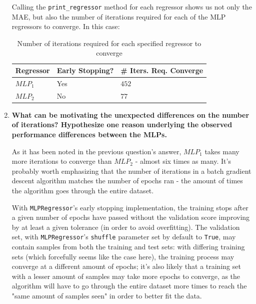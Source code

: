 \documentclass[12pt]{article}
\begin{document}
\begin{enumerate}[leftmargin=\labelsep,resume]
        Calling the \texttt{print\_regressor} method for each regressor shows us
        not only the MAE, but also the number of iterations required for each of
        the MLP regressors to converge. In this case:

        \begin{table}[H]
          \centering
          \begin{tabular}{l|l|l}
            \textbf{Regressor} & \textbf{Early Stopping?} & \textbf{\# Iters. Req. Converge} \\ \hline
            $MLP_1$            & Yes                      & $452$                            \\
            $MLP_2$            & No                       & $77$
          \end{tabular}
          \caption{Number of iterations required for each specified regressor to converge}
          \label{tab:iterations-required-converge}
        \end{table}

        \pagebreak

  \item \textbf{What can be motivating the unexpected differences on the number of iterations?
          Hypothesize one reason underlying the observed performance differences between the MLPs.}

        As it has been noted in the previous question's answer, $MLP_1$ takes many more
        iterations to converge than $MLP_2$ - almost six times as many. It's probably
        worth emphasizing that the number of iterations in a batch gradient descent
        algorithm matches the number of epochs ran - the amount of times the algorithm goes
        through the entire dataset.

        With \texttt{MLPRegressor}'s early stopping implementation, the training stops
        after a given number of epochs have passed without the validation score
        improving by at least a given tolerance (in order to avoid overfitting).
        The validation set, with \texttt{MLPRegressor}'s \texttt{shuffle} parameter
        set by default to \texttt{True}, may contain samples from both the training and test sets:
        with differing training sets (which forcefully seems like the case here),
        the training process may converge at a different amount of epochs; it's
        also likely that a training set with a lesser amount of samples may
        take more epochs to converge, as the algorithm will have to go through
        the entire dataset more times to reach the "same amount of samples seen"
        in order to better fit the data.


\end{enumerate}
\end{document}
